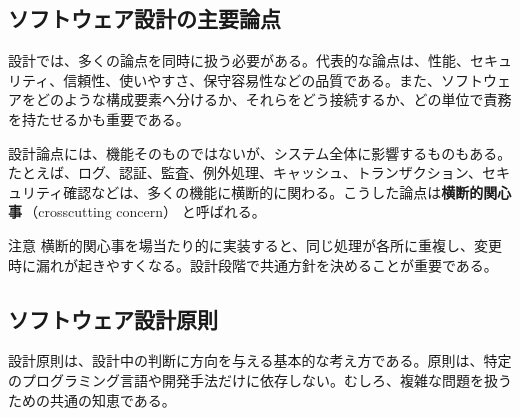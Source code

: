 \documentclass[10.5pt,a4paper]{ltjsarticle}
\newcommand{\term}[2]{\textbf{#1}\,（#2）}
\begin{document}
\subsection{ソフトウェア設計の主要論点}

設計では、多くの論点を同時に扱う必要がある。代表的な論点は、性能、セキュリティ、信頼性、使いやすさ、保守容易性などの品質である。また、ソフトウェアをどのような構成要素へ分けるか、それらをどう接続するか、どの単位で責務を持たせるかも重要である。

設計論点には、機能そのものではないが、システム全体に影響するものもある。たとえば、ログ、認証、監査、例外処理、キャッシュ、トランザクション、セキュリティ確認などは、多くの機能に横断的に関わる。こうした論点は\term{横断的関心事}{crosscutting concern} と呼ばれる。

\begin{pointbox}{注意}
横断的関心事を場当たり的に実装すると、同じ処理が各所に重複し、変更時に漏れが起きやすくなる。設計段階で共通方針を決めることが重要である。
\end{pointbox}

\subsection{ソフトウェア設計原則}

設計原則は、設計中の判断に方向を与える基本的な考え方である。原則は、特定のプログラミング言語や開発手法だけに依存しない。むしろ、複雑な問題を扱うための共通の知恵である。
\end{document}
